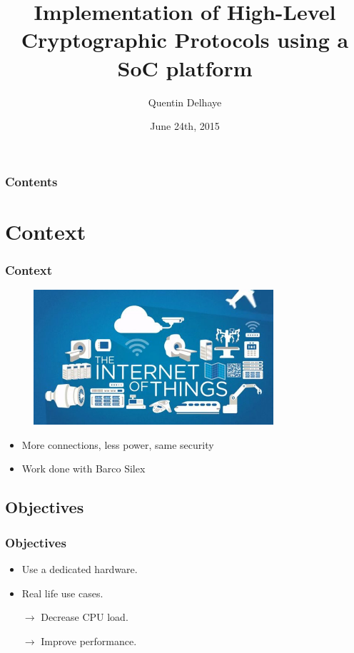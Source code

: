 \documentclass[xcolor={x11names, rgb, usenames, dvipsnames}]{beamer}
\author{Quentin Delhaye}
\title[Crypto using a Soc Platform]{Implementation of High-Level\\ Cryptographic Protocols using a SoC platform}
\institute[ULB]{Université Libre de Bruxelles}
\date{June 24th, 2015}
\begin{document}
\begin{frame}
\titlepage
\end{frame}

\begin{frame}
	\frametitle{Contents}
	\tableofcontents[hideallsubsections]
\end{frame}


\section{Context}

\begin{frame}
\frametitle{Context}
\begin{figure}
\includegraphics[height=5cm]{iot.jpg}%
\end{figure}
\begin{itemize}
	\item More connections, less power, same security
	\item Work done with Barco Silex
\end{itemize}
\end{frame}

\subsection{Objectives}
\begin{frame}
\frametitle{Objectives}
\begin{itemize}
\setlength\itemsep{1em}
	\item Use a dedicated hardware.
	\item Real life use cases.
	\item[$\rightarrow$] Decrease CPU load.
	\item[$\rightarrow$] Improve performance.
\end{itemize}
\end{frame}
\end{document}
